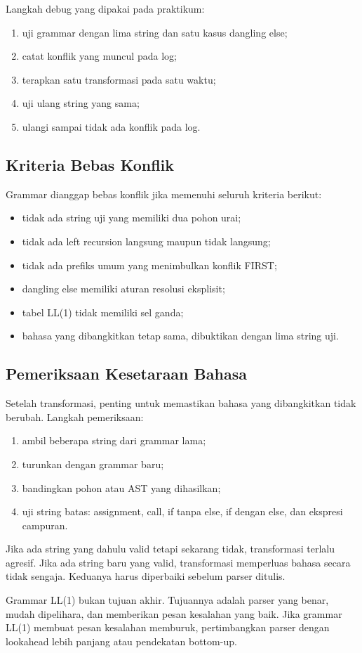 Langkah debug yang dipakai pada praktikum:
\begin{enumerate}[label=\arabic*.,leftmargin=*]
  \item uji grammar dengan lima string dan satu kasus dangling else;
  \item catat konflik yang muncul pada log;
  \item terapkan satu transformasi pada satu waktu;
  \item uji ulang string yang sama;
  \item ulangi sampai tidak ada konflik pada log.
\end{enumerate}

\subsection{Kriteria Bebas Konflik}

Grammar dianggap bebas konflik jika memenuhi seluruh kriteria berikut:
\begin{itemize}[leftmargin=*]
  \item tidak ada string uji yang memiliki dua pohon urai;
  \item tidak ada left recursion langsung maupun tidak langsung;
  \item tidak ada prefiks umum yang menimbulkan konflik FIRST;
  \item dangling else memiliki aturan resolusi eksplisit;
  \item tabel LL(1) tidak memiliki sel ganda;
  \item bahasa yang dibangkitkan tetap sama, dibuktikan dengan lima
        string uji.
\end{itemize}

\subsection{Pemeriksaan Kesetaraan Bahasa}

Setelah transformasi, penting untuk memastikan bahasa yang
dibangkitkan tidak berubah. Langkah pemeriksaan:
\begin{enumerate}[label=\arabic*.,leftmargin=*]
  \item ambil beberapa string dari grammar lama;
  \item turunkan dengan grammar baru;
  \item bandingkan pohon atau AST yang dihasilkan;
  \item uji string batas: assignment, call, if tanpa else, if dengan
        else, dan ekspresi campuran.
\end{enumerate}

Jika ada string yang dahulu valid tetapi sekarang tidak, transformasi
terlalu agresif. Jika ada string baru yang valid, transformasi
memperluas bahasa secara tidak sengaja. Keduanya harus diperbaiki
sebelum parser ditulis.

\begin{infobox}
Grammar LL(1) bukan tujuan akhir. Tujuannya adalah parser yang benar,
mudah dipelihara, dan memberikan pesan kesalahan yang baik. Jika
grammar LL(1) membuat pesan kesalahan memburuk, pertimbangkan parser
dengan lookahead lebih panjang atau pendekatan bottom-up.
\end{infobox}
